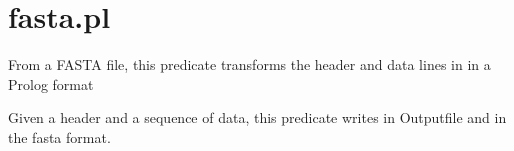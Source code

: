 


\section{fasta.pl}

\label{sec:fasta}

\begin{description}
From a FASTA file, this predicate transforms the header and data lines in
in a Prolog format

Given a header and a sequence of data, this predicate
writes in Outputfile  and  in the fasta
format.
\end{description}

